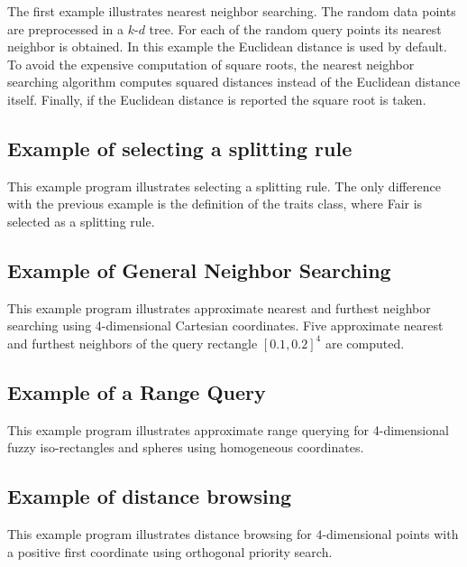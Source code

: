 The first example illustrates nearest neighbor searching. The random data points are preprocessed
in a $k$-$d$ tree. For each of the random query points its nearest neighbor is obtained.
In this example
the Euclidean distance is used by default. To avoid the expensive computation
of square roots, the nearest neighbor searching algorithm computes
squared distances instead of the Euclidean distance itself. 
Finally, if the Euclidean distance is reported the square root is taken.


\subsection{Example of selecting a splitting rule}

This example program illustrates selecting a splitting rule.
The only difference with the previous example is the
definition of the traits class, where Fair is selected as a splitting rule.


\subsection{Example of General Neighbor Searching}

This example program illustrates approximate nearest and furthest neighbor searching
using 4-dimensional Cartesian coordinates.
Five approximate nearest and furthest neighbors of
the query rectangle $[0.1,0.2]^4$ are computed.
 

\subsection{Example of a Range Query}

This example program illustrates approximate range querying for
4-dimensional fuzzy iso-rectangles and spheres
using homogeneous coordinates.



\subsection{Example of distance browsing}

This example program illustrates distance browsing for $4$-dimensional points with
a positive first coordinate using orthogonal priority search.

